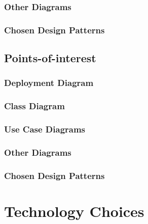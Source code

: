 \documentclass{article}
\begin{document}
        \subsubsection{Other Diagrams}
        \subsubsection{Chosen Design Patterns}
    \subsection{Points-of-interest}
        \subsubsection{Deployment Diagram}
        \subsubsection{Class Diagram}
        \subsubsection{Use Case Diagrams}
        \subsubsection{Other Diagrams}
        \subsubsection{Chosen Design Patterns}
\section{Technology Choices}
\end{document}
